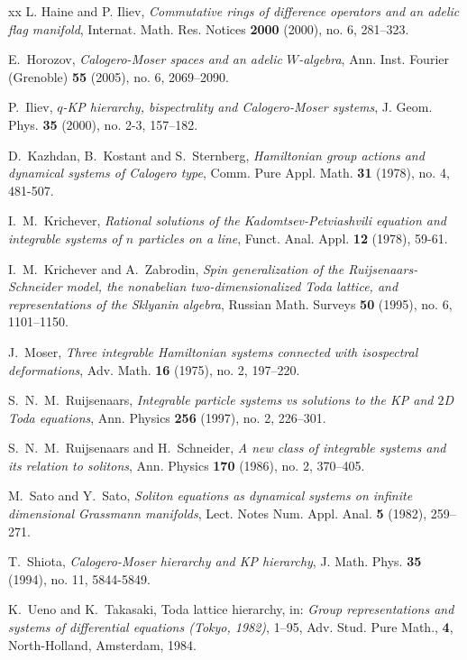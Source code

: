 \documentclass[11pt,reqno]{amsart}
\theoremstyle{definition}
\numberwithin{equation}{section}
\begin{document}
\begin{thebibliography}{xx}
 L. Haine and P. Iliev, {\em Commutative rings of difference 
operators and an adelic flag manifold}, Internat. Math. Res. Notices 
{\bf 2000} (2000), no. 6, 281--323.

 E.~Horozov, {\em Calogero-Moser spaces and an adelic 
$W$-algebra}, Ann. Inst. Fourier (Grenoble)  {\bf 55}  (2005),  no. 6, 
2069--2090. 
 
 P.~Iliev, {\em $q$-KP hierarchy, bispectrality and Calogero-Moser 
systems}, J. Geom. Phys. {\bf 35} (2000),  no. 2-3, 157--182. 

 D.~Kazhdan, B.~Kostant and S.~Sternberg, {\em Hamiltonian 
group actions and dynamical systems of Calogero type}, Comm. Pure Appl. 
Math. {\bf 31} (1978), no. 4, 481-507.

 I.~M.~Krichever, {\em Rational solutions of the 
Kadomtsev-Petviashvili equation and integrable systems of $n$ particles on a 
line}, Funct. Anal. Appl. {\bf 12} (1978), 59-61.

 I.~M.~Krichever and A.~Zabrodin, {\em Spin generalization of the 
Ruijsenaars-Schneider model, the nonabelian two-dimensionalized Toda lattice, 
and representations of the Sklyanin algebra}, 
Russian Math. Surveys {\bf 50} (1995), no. 6, 1101--1150.


 J.~Moser, {\em Three integrable Hamiltonian systems connected with 
isospectral deformations}, Adv. Math. {\bf 16} (1975), no. 2, 197--220. 

 S.~N.~M.~Ruijsenaars, {\em Integrable particle systems vs 
solutions to the KP and $2$D Toda equations}, 
Ann. Physics {\bf 256} (1997), no. 2, 226--301.

 S.~N.~M.~Ruijsenaars and H.~Schneider, {\em A new class of 
integrable systems and its relation to solitons}, 
Ann. Physics {\bf 170} (1986), no. 2, 370--405.

 M.~Sato and Y.~Sato, {\em Soliton equations as dynamical systems 
on infinite dimensional Grassmann manifolds}, Lect. Notes Num. Appl. Anal. 
{\bf 5 } (1982), 259--271.

 T.~Shiota, {\em Calogero-Moser hierarchy and KP hierarchy}, 
J. Math. Phys. {\bf 35} (1994), no. 11, 5844-5849.

  K.~Ueno and K.~Takasaki, {Toda lattice hierarchy}, in: 
{\em Group representations and systems of differential equations 
(Tokyo, 1982)}, 1--95, Adv. Stud. Pure Math., {\bf 4}, North-Holland, 
Amsterdam, 1984. 


\end{thebibliography}
\end{document}
